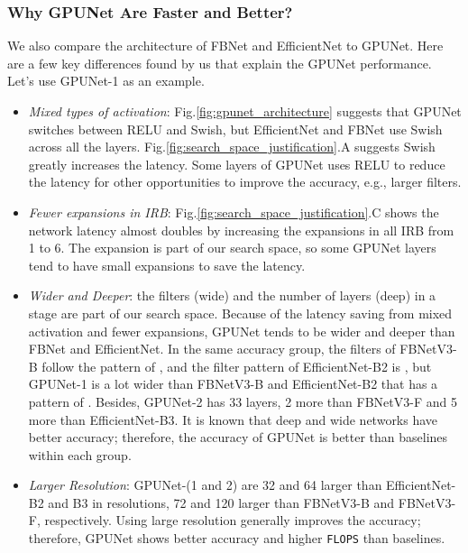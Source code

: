 \documentclass[10pt,twocolumn,letterpaper]{article}
\begin{document}
\subsubsection{Why GPUNet Are Faster and Better?}
\label{sec:gpunet_explaination}
We also compare the architecture of FBNet and EfficientNet to GPUNet. Here are a few key differences found by us that explain the GPUNet performance. Let's use GPUNet-1 as an example.
\begin{itemize}
  \item \textit{Mixed types of activation}: Fig.\ref{fig:gpunet_architecture} suggests that GPUNet switches between RELU and Swish, but EfficientNet and FBNet use Swish across all the layers. Fig.\ref{fig:search_space_justification}.A suggests Swish greatly increases the latency. Some layers of GPUNet uses RELU to reduce the latency for other opportunities to improve the accuracy, e.g., larger filters.
  \item \textit{Fewer expansions in IRB}: Fig.\ref{fig:search_space_justification}.C shows the network latency almost doubles by increasing the expansions in all IRB from 1 to 6. The expansion is part of our search space, so some GPUNet layers tend to have small expansions to save the latency.
  \item \textit{Wider and Deeper}: the filters (wide) and the number of layers (deep) in a stage are part of our search space. Because of the latency saving from mixed activation and fewer expansions, GPUNet tends to be wider and deeper than FBNet and EfficientNet. In the same accuracy group, the filters of FBNetV3-B follow the pattern of , and the filter pattern of EfficientNet-B2 is , but GPUNet-1 is a lot wider than FBNetV3-B and EfficientNet-B2 that has a pattern of . Besides, GPUNet-2 has 33 layers, 2 more than FBNetV3-F and 5 more than EfficientNet-B3. It is known that deep and wide networks have better accuracy; therefore, the accuracy of GPUNet is better than baselines within each group.
  \item \textit{Larger Resolution}: GPUNet-(1 and 2) are 32 and 64 larger than EfficientNet-B2 and B3 in resolutions, 72 and 120 larger than FBNetV3-B and FBNetV3-F, respectively. Using large resolution generally improves the accuracy; therefore, GPUNet shows better accuracy and higher {\tt FLOPS} than baselines.
\end{itemize}
\end{document}
